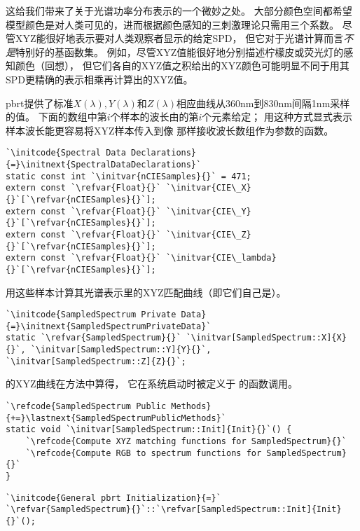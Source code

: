 这给我们带来了关于光谱功率分布表示的一个微妙之处。
大部分颜色空间都希望模型颜色是对人类可见的，进而根据颜色感知的三刺激理论只需用三个系数。
尽管XYZ能很好地表示要对人类观察者显示的给定SPD，
但它对于光谱计算而言{\itshape 不是}特别好的基函数集。
例如，尽管XYZ值能很好地分别描述柠檬皮或荧光灯的感知颜色（回想），
但它们各自的XYZ值之积给出的XYZ颜色可能明显不同于用其SPD更精确的表示相乘再计算出的XYZ值。

pbrt提供了标准$X(\lambda),Y(\lambda)$和$Z(\lambda)$相应曲线从360nm到830nm间隔1nm采样的值。
下面的数组中第$i$个样本的波长由的第$i$个元素给定；
用这种方式显式表示样本波长能更容易将XYZ样本传入到像
那样接收波长数组作为参数的函数。
\begin{lstlisting}
`\initcode{Spectral Data Declarations}{=}\initnext{SpectralDataDeclarations}`
static const int `\initvar{nCIESamples}{}` = 471;
extern const `\refvar{Float}{}` `\initvar{CIE\_X}{}`[`\refvar{nCIESamples}{}`];
extern const `\refvar{Float}{}` `\initvar{CIE\_Y}{}`[`\refvar{nCIESamples}{}`];
extern const `\refvar{Float}{}` `\initvar{CIE\_Z}{}`[`\refvar{nCIESamples}{}`];
extern const `\refvar{Float}{}` `\initvar{CIE\_lambda}{}`[`\refvar{nCIESamples}{}`];
\end{lstlisting}

用这些样本计算其光谱表示里的XYZ匹配曲线（即它们自己是）。
\begin{lstlisting}
`\initcode{SampledSpectrum Private Data}{=}\initnext{SampledSpectrumPrivateData}`
static `\refvar{SampledSpectrum}{}` `\initvar[SampledSpectrum::X]{X}{}`, `\initvar[SampledSpectrum::Y]{Y}{}`, `\initvar[SampledSpectrum::Z]{Z}{}`;
\end{lstlisting}

的XYZ曲线在方法中算得，
它在系统启动时被定义于
的函数调用。
\begin{lstlisting}
`\refcode{SampledSpectrum Public Methods}{+=}\lastnext{SampledSpectrumPublicMethods}`
static void `\initvar[SampledSpectrum::Init]{Init}{}`() {
    `\refcode{Compute XYZ matching functions for SampledSpectrum}{}`
    `\refcode{Compute RGB to spectrum functions for SampledSpectrum}{}`
}
\end{lstlisting}
\begin{lstlisting}
`\initcode{General pbrt Initialization}{=}`
`\refvar{SampledSpectrum}{}`::`\refvar[SampledSpectrum::Init]{Init}{}`();
\end{lstlisting}

